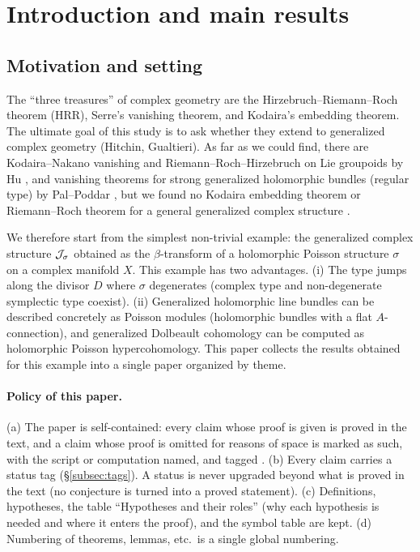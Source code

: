\section{Introduction and main results}\label{sec:intro}
\subsection{Motivation and setting}
The ``three treasures'' of complex geometry are the Hirzebruch--Riemann--Roch theorem (HRR), Serre's vanishing theorem, and Kodaira's embedding theorem. The ultimate goal of this study is to ask whether they extend to generalized complex geometry (Hitchin, Gualtieri). As far as we could find, there are Kodaira--Nakano vanishing and Riemann--Roch--Hirzebruch on Lie groupoids by Hu \cite{Hu1,Hu2}, and vanishing theorems for strong generalized holomorphic bundles (regular type) by Pal--Poddar \cite{PP}, but we found no Kodaira embedding theorem or Riemann--Roch theorem for a general generalized complex structure \tC.

We therefore start from the simplest non-trivial example: the generalized complex structure $\mathcal J_\sigma$ obtained as the $\beta$-transform of a holomorphic Poisson structure $\sigma$ on a complex manifold $X$. This example has two advantages. (i) The type jumps along the divisor $D$ where $\sigma$ degenerates (complex type and non-degenerate symplectic type coexist). (ii) Generalized holomorphic line bundles can be described concretely as Poisson modules (holomorphic bundles with a flat $A$-connection), and generalized Dolbeault cohomology can be computed as holomorphic Poisson hypercohomology. This paper collects the results obtained for this example into a single paper organized by theme.

\paragraph{Policy of this paper.}
(a) The paper is self-contained: every claim whose proof is given is proved in the text, and a claim whose proof is omitted for reasons of space is marked as such, with the script or computation named, and tagged \tV. (b) Every claim carries a status tag (\S\ref{subsec:tags}). A status is never upgraded beyond what is proved in the text (no conjecture is turned into a proved statement). (c) Definitions, hypotheses, the table ``Hypotheses and their roles'' (why each hypothesis is needed and where it enters the proof), and the symbol table are kept. (d) Numbering of theorems, lemmas, etc.\ is a single global numbering.

